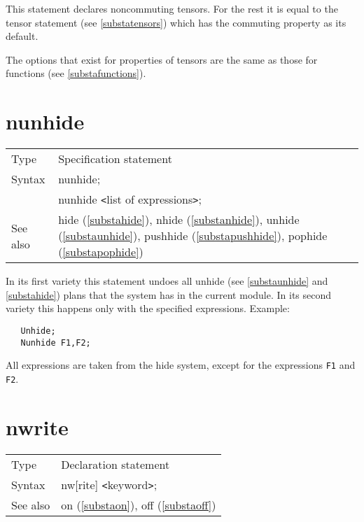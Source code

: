 \noindent This statement declares 
noncommuting tensors. For 
the rest it is equal to the tensor statement (see 
\ref{substatensors}) which has the commuting property as its default.

\noindent The options that exist for properties of tensors are the same as 
those for functions (see \ref{substafunctions}). \vspace{10mm}


\section{nunhide}
\label{substanunhide}

\noindent \begin{tabular}{ll}
Type & Specification statement\\
Syntax & nunhide; \\
       & nunhide {\tt<}list of expressions{\tt>};
\\ See also & hide (\ref{substahide}),
              nhide (\ref{substanhide}),
              unhide (\ref{substaunhide}),
              pushhide (\ref{substapushhide}),
              pophide (\ref{substapophide})
\end{tabular} \vspace{4mm}

\noindent In its first variety this statement undoes all 
unhide (see \ref{substaunhide} and \ref{substahide}) plans 
that the system has in the current module. In its second variety this 
happens only with the specified expressions. Example:
\begin{verbatim}
   Unhide;
   Nunhide F1,F2;
\end{verbatim}
All expressions are taken from the hide system, except for the 
expressions \verb:F1: and \verb:F2:. \vspace{10mm}


\section{nwrite}
\label{substanwrite}

\noindent \begin{tabular}{ll}
Type & Declaration statement\\
Syntax & nw[rite] {\tt<}keyword{\tt>};
\\ See also & on (\ref{substaon}), off (\ref{substaoff})
\end{tabular} \vspace{4mm}

